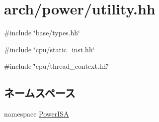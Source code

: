 \hypertarget{power_2utility_8hh}{
\section{arch/power/utility.hh}
\label{power_2utility_8hh}
}
{\ttfamily \#include \char`\"{}base/types.hh\char`\"{}}\par
{\ttfamily \#include \char`\"{}cpu/static\_\-inst.hh\char`\"{}}\par
{\ttfamily \#include \char`\"{}cpu/thread\_\-context.hh\char`\"{}}\par
\subsection*{ネームスペース}
\begin{DoxyCompactItemize}
\item 
namespace \hyperlink{namespacePowerISA}{PowerISA}
\end{DoxyCompactItemize}
